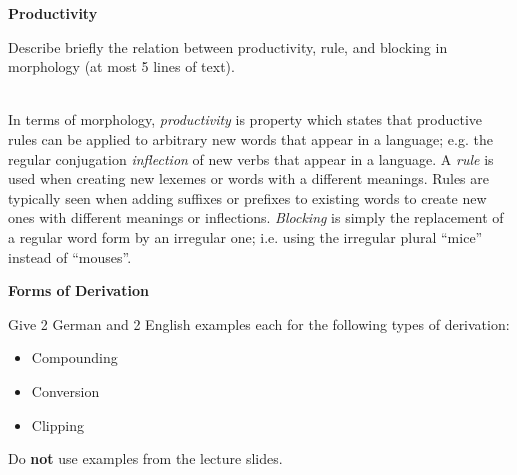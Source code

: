 \documentclass[11pt]{article}
\begin{document}
\vspace*{0.5cm}

\begin{problem}{4}
\textbf{Productivity}

Describe briefly the relation between productivity, rule, and blocking in morphology (at most
5 lines of text).

\end{problem}

\begin{solution} \\
In terms of morphology, \textit{productivity} is property which states that productive rules can be applied to arbitrary new words that appear in a language; e.g. the regular conjugation \textit{inflection} of new verbs that appear in a language.  A \textit{rule} is used when creating new lexemes or words with a different meanings.  Rules are typically seen when adding suffixes or prefixes to existing words to create new ones with different meanings or inflections. \textit{Blocking} is simply the replacement of a regular word form by an irregular one; i.e. using the irregular plural ``mice'' instead of ``mouses''.
\end{solution}

\vspace*{0.5cm}
\newpage

\begin{problem}{5}
\textbf{Forms of Derivation}

Give 2 German and 2 English examples each for the following types of derivation:
\begin{itemize}
	\item Compounding
	\item Conversion
	\item Clipping
\end{itemize}

Do \textbf{not} use examples from the lecture slides.

\end{problem}
\end{document}
